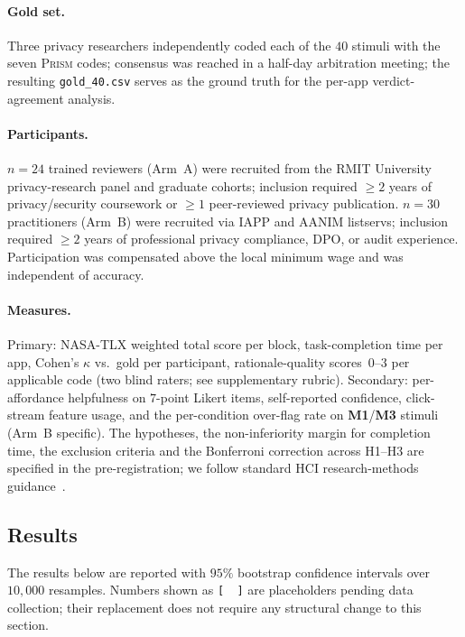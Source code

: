 \documentclass[11pt,a4paper]{article}
\newcommand{\prism}{\textsc{Prism}}
\newcommand{\code}[1]{\textsf{\textbf{#1}}}
\begin{document}
\paragraph{Gold set.}
Three privacy researchers independently coded each of the $40$
stimuli with the seven \prism{} codes; consensus was reached in a
half-day arbitration meeting; the resulting \texttt{gold\_40.csv}
serves as the ground truth for the per-app verdict-agreement
analysis.

\paragraph{Participants.}
$n\!=\!24$ trained reviewers (Arm~A) were recruited from the
RMIT University privacy-research panel and graduate cohorts;
inclusion required $\geq 2$ years of privacy/security coursework or
$\geq 1$ peer-reviewed privacy publication. $n\!=\!30$ practitioners
(Arm~B) were recruited via IAPP and AANIM listservs; inclusion
required $\geq 2$ years of professional privacy compliance, DPO, or
audit experience. Participation was compensated above the local
minimum wage and was independent of accuracy.

\paragraph{Measures.}
Primary: NASA-TLX weighted total score per block, task-completion
time per app, Cohen's $\kappa$ vs.\ gold per participant,
rationale-quality scores~$0$--$3$ per applicable code (two blind
raters; see supplementary rubric). Secondary: per-affordance
helpfulness on $7$-point Likert items, self-reported confidence,
click-stream feature usage, and the per-condition over-flag rate on
\code{M1}/\code{M3} stimuli (Arm~B specific). The hypotheses, the
non-inferiority margin for completion time, the exclusion criteria
and the Bonferroni correction across H1--H3 are specified in the
pre-registration; we follow standard HCI research-methods
guidance~\citep{lazar2017research}.

\subsection{Results}\label{sec:user-results}

\noindent
The results below are reported with $95\%$ bootstrap confidence
intervals over $10{,}000$ resamples. Numbers shown as \texttt{[\,\,]}
are placeholders pending data collection; their replacement does not
require any structural change to this section.
\end{document}
